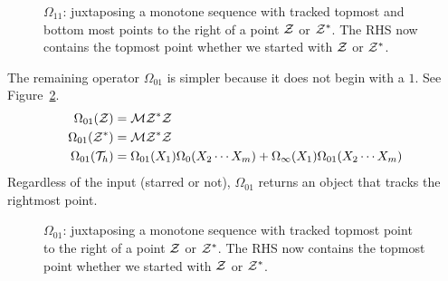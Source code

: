 \documentclass[12pt, a4paper, twoside]{report}
\begin{document}
\begin{figure}[ht]
 \centering
  \caption{$\Omega_{11}$: juxtaposing a monotone sequence with tracked topmost and bottom most points to the right of a point $\mathcal{Z}$ or $\mathcal{Z}^*$. The RHS now contains the topmost point whether we started with $\mathcal{Z}$ or $\mathcal{Z}^*$.}
  \label{fig:omega11}
\end{figure}

The remaining operator $\Omega_{01}$ is simpler because it does not begin with a $1$. See Figure~\ref{fig:omega01}.
\begin{align*}
  \Omega_{01}(\mathcal{Z}) &= \mathcal{M}\mathcal{Z}^*\mathcal{Z}\\
  \Omega_{01}(\mathcal{Z}^*) &= \mathcal{M}\mathcal{Z}^*\mathcal{Z}\\
  \Omega_{01}(\mathcal{T}_h) &= \Omega_{01}(X_1)\Omega_0(X_2\cdots X_m)+\Omega_\infty(X_1)\Omega_{01}(X_2\cdots X_m)
\end{align*}
Regardless of the input (starred or not), $\Omega_{01}$ returns an object that tracks the rightmost point.

\begin{figure}[ht]
 \centering
  \caption{$\Omega_{01}$: juxtaposing a monotone sequence with tracked topmost point to the right of a point $\mathcal{Z}$ or $\mathcal{Z}^*$. The RHS now contains the topmost point whether we started with $\mathcal{Z}$ or $\mathcal{Z}^*$.}
  \label{fig:omega01}
\end{figure}
\end{document}
